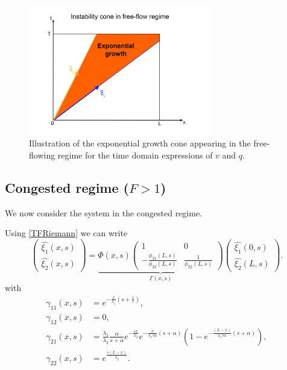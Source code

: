 \documentclass[preprint]{elsarticle}
\begin{document}
\begin{figure}
\begin{centering}
\includegraphics[width=8cm]{Exp-growth}
\par\end{centering}
\protect\caption{Illustration of the exponential growth cone appearing in the free-flowing regime for the time domain expressions of $v$ and $q$.\label{Exp-growth}}
\end{figure}

\subsection{Congested regime ($F>1$)}
We now consider the system in the congested regime.

Using \eqref{TFRiemann} we can write 
\begin{equation} \label{vqcongested}
\begin{pmatrix}
\hat{\xi_{1}}(x,s)\\
\hat{\xi_{2}}(x,s)
\end{pmatrix} = \underbrace{
\Phi(x,s) \begin{pmatrix}
1 & 0\\
-\frac{\phi_{21}\left(L,s\right)}{\phi_{22}\left(L,s\right)} & \frac{1}{\phi_{22}\left(L,s\right)}
\end{pmatrix}}_\text{$\Gamma (x,s)$}
\begin{pmatrix}
\hat{\xi_{1}}\left(0,s\right)\\
\hat{\xi_{2}}\left(L,s\right)
\end{pmatrix}.
\end{equation}
with 
\begin{subequations}
\begin{align}
\gamma_{11}\left(x,s\right)&=
e^{-\frac{x}{\lambda_{1}}\left(s+\frac{1}{\tau}\right)} ,\\
\gamma_{12}\left(x,s\right)&=0, \\
\gamma_{21}\left(x,s\right)&=
\frac{\lambda_{1}}{\lambda_{2}}
\frac{\alpha}{s + \alpha}
e^{-\frac{sx}{\lambda_{2}}}
e^{-\frac{x}{\lambda_{1}\tau\alpha}
\left(s+\alpha\right)}
\left(
	1 -
	e^{-\frac{\left(L - x\right)
		}{
		\lambda_{1}\tau\alpha
		}
		\left(s+\alpha\right)
		}
\right)
, \\
\gamma_{22}\left(x,s\right)&=e^{\frac{s\left(L-x\right)}{\lambda_{2}}}.
\end{align}
\end{subequations}
\end{document}
